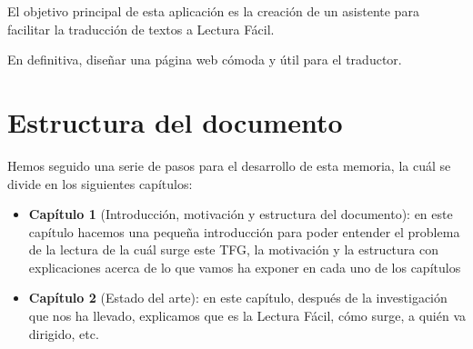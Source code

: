  \setlength{\parskip}{10pt}
 
El objetivo principal de esta aplicación es la creación de un asistente para facilitar la traducción de textos a Lectura Fácil. 

 \setlength{\parskip}{10pt}


En definitiva, diseñar una página web cómoda y útil para el traductor.

\section{Estructura del documento}


Hemos seguido una serie de pasos para el desarrollo de esta memoria, la cuál se divide en los siguientes capítulos:

\begin{itemize}
	\item {\textbf{Capítulo 1}} (Introducción, motivación y estructura del documento): en este capítulo hacemos una pequeña introducción para poder entender el problema de la lectura de la cuál surge este TFG, la motivación y la estructura con explicaciones acerca de lo que vamos ha exponer en cada uno de los capítulos
	
 \setlength{\parskip}{10pt}
	
	\item{\textbf{ Capítulo 2}} (Estado del arte): en este capítulo, después de la investigación que nos ha llevado, explicamos que es la Lectura Fácil, cómo surge, a quién va dirigido, etc.

\end{itemize}

